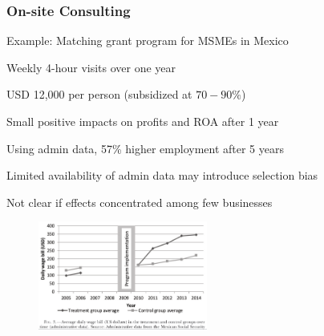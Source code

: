 \documentclass[hideothersubsections, usenames,dvipsnames,11pt]{beamer}
\newenvironment{itemize_2pt}{\itemize\addtolength{\itemsep}{2pt}}{\enditemize}
\begin{document}
\begin{frame}
\frametitle{On-site Consulting}

Example: Matching grant program for MSMEs in Mexico \citep{Bruhn2018}
\begin{itemize_2pt}

	\item Weekly 4-hour visits over one year
	\item USD 12,000 per person (subsidized at $70-90\%$)
	\item \textcolor{bdf}{Small positive impacts on profits and ROA after 1 year}
	

	\vspace{0.5em}	
	
	\item Using admin data, \textcolor{bdf}{57\% higher employment after 5 years}
	\begin{itemize_2pt}
		\item Limited availability of admin data may introduce \textcolor{bdf}{selection bias}
		\item Not clear if effects concentrated among few businesses
	\end{itemize_2pt}
\end{itemize_2pt}

\begin{figure}[htbp]
	\centering
	\includegraphics[width=15em]{pics/Bruhn2018_consult.png}
	\label{Bruhn (2018): Consulting}
\end{figure}


\end{frame}

\end{document}
